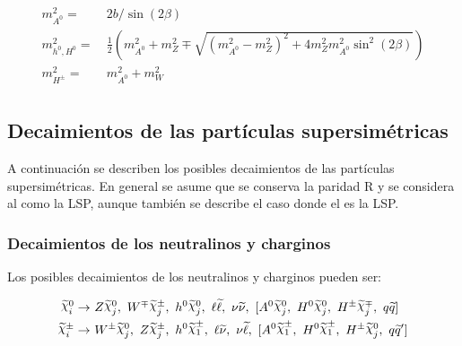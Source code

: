 
\begin{equation}
	\begin{split}
		m_{A^0}^2 = &\ 2b/\sin(2\beta) \\
		m_{h^0 , H^0}^2 = &\ \frac{1}{2}\left( m_{A^0}^2 + m_Z^2 \mp \sqrt{(m_{A^0}^2-m_Z^2)^2 + 4m_Z^2 m_{A^0}^2 \sin^2(2\beta)} \right) \\
		m_{H^{\pm}}^2 = &\ m_{A^0}^2 + m_W^2 \\
	\end{split}
\end{equation}


\subsection{Decaimientos de las partículas supersimétricas}

A continuación se describen los posibles decaimientos de las partículas supersimétricas. En general se asume que se conserva la paridad R y se considera al \ninoone como la LSP, aunque también se describe el caso donde el \gravino es la LSP.

\subsubsection{Decaimientos de los neutralinos y charginos}

Los posibles decaimientos de los neutralinos y charginos pueden ser:


\begin{equation}
	\begin{split}
		\ggino^0_i \to &\ \Zboson\ggino^0_j,\ \Wmp\ggino^\pm_j,\ h^0\ggino^0_j,\ \ell\slepton,\ \nu\snu,\ [\Azero\ggino^0_j,\ \Hzero\ggino^0_j,\ \Hpm\ggino^\mp_j,\ q\squark] \\
		\ggino^\pm_i \to &\ \Wpm\ggino^0_j,\ \Zboson\ggino^\pm_j,\ h^0\chinoonepm,\ \ell\snu,\ \nu\slepton,\ [\Azero\chinoonepm,\ \Hzero\chinoonepm,\ \Hpm\ggino^0_j,\ q\squark'] \\
	\end{split}
\end{equation}

